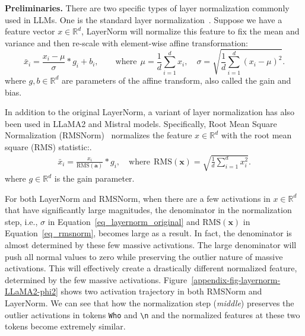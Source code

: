 \documentclass[10pt]{article}
\newcommand{\mbf}[1]{\mathbf{#1}}
\begin{document}
\textbf{Preliminaries.} There are two specific types of layer normalization commonly used in LLMs. One is the standard layer normalization~\citep{ba2016layernorm}. Suppose we have a feature vector $x\in\mathbb{R}^{d}$, LayerNorm will normalize this feature to fix the mean and variance and then re-scale with element-wise affine transformation:
\begin{equation}\label{eq_layernorm_original}
    \bar{x}_{i} = \frac{x_{i}-\mu}{\sigma}*g_{i} + b_{i}, \quad\quad \text{where}~~ \mu = \frac{1}{d}\sum_{i=1}^{d} x_i, \quad \sigma = \sqrt{\frac{1}{d}\sum_{i=1}^{d}(x_i - \mu)^2}.
\end{equation}
where $g,b\in\mathbb{R}^{d}$ are parameters of the affine transform, also called the gain and bias.

In addition to the original LayerNorm, a variant of layer normalization has also been used in LLaMA2 and Mistral models. Specifically, Root Mean Square Normalization (RMSNorm)~\citep{zhang2019rmsnorm} normalizes the feature $x\in\mathbb{R}^{d}$ with the root mean square (RMS) statistic:.
\begin{align}\label{eq_rmsnorm}
 \bar{x}_i = \frac{x_i}{\text{RMS}(\mathbf{a})}* g_i, \quad \text{where}~~ \text{RMS}(\mathbf{x}) = \sqrt{\frac{1}{d} \sum_{i=1}^{d} x_i^2}.
\end{align}
where $g\in\mathbb{R}^{d}$ is the gain parameter.

For both LayerNorm and RMSNorm, when there are a few activations in $x\in\mathbb{R}^{d}$ that have significantly large magnitudes, the denominator in the normalization step, i.e., $\sigma$ in Equation~\ref{eq_layernorm_original} and $\text{RMS}(\mbf{x})$ in Equation~\ref{eq_rmsnorm}, becomes large as a result. In fact, the denominator is almost determined by these few massive activations. The large denominator will push all normal values to zero while preserving the outlier nature of massive activations. This will effectively create a drastically different normalized feature, determined by the few massive activations. 
Figure~\ref{appendix-fig-layernorm-LLaMA2-phi2} shows two activation trajectory in both RMSNorm and LayerNorm. We can see that how the normalization step (\textit{middle}) preserves the outlier activations in tokens \texttt{Who} and \texttt{\textbackslash n} and the normalized features at these two tokens become extremely similar.
\end{document}
